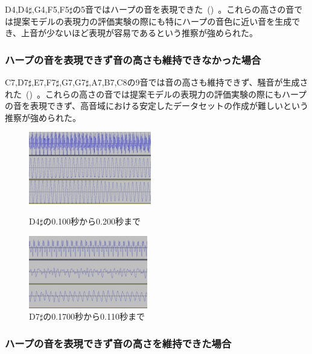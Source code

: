 D4,D4$\sharp$,G4,F5,F5$\sharp$の5音ではハープの音を表現できた~()~。これらの高さの音では提案モデルの表現力の評価実験の際にも特にハープの音色に近い音を生成でき、上音が少ないほど表現が容易であるという推察が強められた。

\subsubsection{ハープの音を表現できず音の高さも維持できなかった場合}

C7,D7$\sharp$,E7,F7$\sharp$,G7,G7$\sharp$,A7,B7,C8の9音では音の高さも維持できず、騒音が生成された~()~。これらの高さの音では提案モデルの表現力の評価実験の際にもハープの音を表現できず、高音域における安定したデータセットの作成が難しいという推察が強められた。

\begin{figure}[t]
\centering
\begin{minipage}[b]{0.48\columnwidth}
\centering
\includegraphics[height=90pt]{figure/66_22_det/d4s_0100_0200.png}
\caption[実験2：ハープの音を表現できた音波]{D4$\sharp$の0.100秒から0.200秒まで}
\label{fig:66_22_near}
\end{minipage}
\begin{minipage}[b]{0.48\columnwidth}
\centering
\includegraphics[height=90pt]{figure/66_22_det/d7s_0100_0110.png}
\caption[実験2：ハープの音を表現できず音の高さも維持できなかった音波]{D7$\sharp$の0.1700秒から0.110秒まで}
\label{fig:66_22_bad4}
\end{minipage}
\end{figure}

\subsubsection{ハープの音を表現できず音の高さを維持できた場合}

